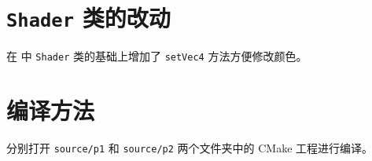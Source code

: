 \documentclass[math-font=newcm]{sjtuarticle}
\providecommand{\code}[2]{}
\providecommand{\codeRange}[4]{}
\begin{document}
\code{../source/p2/src/NUNRB.h}{c++}

\section{\texttt{Shader} 类的改动}

在 \parencite{shaders} 中 \texttt{Shader} 类的基础上增加了 \texttt{setVec4} 方法方便修改颜色。

\codeRange{../source/p1/src/shader\_s.h}{c++}{94}{97}

\section{编译方法}

分别打开 \verb"source/p1" 和 \verb"source/p2" 两个文件夹中的 CMake 工程进行编译。

\printbibliography[heading=bibintoc]
\end{document}
